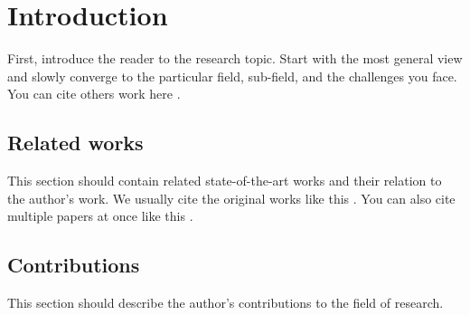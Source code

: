 
\chapter{Introduction\label{chap:introduction}}

First, introduce the reader to the research topic.
Start with the most general view and slowly converge to the particular field, sub-field, and the challenges you face.
You can cite others work here \cite{baca2021mrs}.

\section{Related works}

This section should contain related state-of-the-art works and their relation to the author's work.
We usually cite the original works like this \cite{benallegue2008high}.
You can also cite multiple papers at once like this \cite{baca2016embedded, baca2021mrs}.

\section{Contributions}

This section should describe the author's contributions to the field of research.
